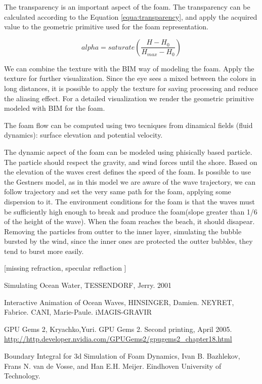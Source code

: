 \documentclass{report}
\begin{document}
The transparency is an important aspect of the foam. The transparency can be calculated\cite{nvidia} according to the Equation \ref{equa:transparency}, and apply the acquired value to the geometric primitive used for the foam representation.

\begin{equation}
alpha=saturate(\frac{H-H_0}{H_{max} - H_0})
\label{equa:transparency}
\end{equation}

We can combine the texture with the BIM way of modeling the foam. Apply the texture for further visualization. Since the eye sees a mixed between the colors in long distances, it is possible to apply the texture for saving processing and reduce the aliasing effect.
For a detailed visualization we render the geometric primitive modeled with BIM for the foam.

The foam flow can be computed using two tecniques from dinamical fields (fluid dynamics): surface elevation and potential velocity.

The dynamic aspect of the foam can be modeled using phisically based particle. The particle should respect the gravity, and wind forces until the shore. Based on the elevation of the waves crest defines the speed of the foam. Is possible to use the Gestners model, as in this model we are aware of the wave trajectory, we can follow trajectory and set the very same path for the foam, applying some dispersion to it\cite{iaow}.
The environment conditions for the foam is that the waves must be sufficiently high enough to break and produce the foam(slope greater than 1/6 \cite{sow} of the height of the wave).
When the foam reaches the beach, it should disapear. Removing the particles from outter to the inner layer, simulating the bubble bursted by the wind, since the inner ones are protected the outter bubbles, they tend to burst more easily.

[missing refraction, specular reflaction ]


\begin{thebibliography}{9}

  Simulating Ocean Water,
  TESSENDORF, Jerry.
  2001

  Interactive Animation of Ocean Waves,
  HINSINGER, Damien. NEYRET, Fabrice. CANI, Marie-Paule.
  iMAGIS-GRAVIR

  GPU Gems 2,
  Kryachko,Yuri.
  GPU Gems 2. 
  Second printing, April 2005.
  \url{http://http.developer.nvidia.com/GPUGems2/gpugems2_chapter18.html}

  Boundary Integral for 3d Simulation of Foam Dynamics,
  Ivan B. Bazhlekov, Frans N. van de Vosse, and Han E.H. Meijer.
  Eindhoven University of Technology.

\end{thebibliography}
\end{document}
